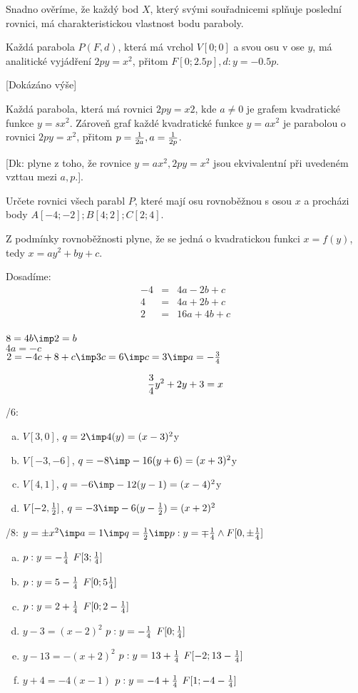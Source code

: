 Snadno ověríme, že každý bod $X$, který svými souřadnicemi splňuje poslední rovnici, má charakteristickou vlastnost bodu paraboly.

\V 
Každá parabola $P(F,d)$, která má vrchol $V[0;0]$ a svou osu v ose $y$, má analitické vyjádření $2py = x^2$, přitom $F[0;2.5p], d:y=-0.5p$.

[Dokázáno výše]

\V Každá parabola, která má rovnici $2py = x2$, kde $a\neq 0$ je grafem kvadratické funkce $y=sx^2$.
Zároveň graf každé kvadratické funkce $y=ax^2$ je parabolou o rovnici $2py=x^2$, přitom $p = \frac 1{2a},a=\frac1{2p}$.

[Dk: plyne z toho, že rovnice $y=ax^2, 2py = x^2$ jsou ekvivalentní při uvedeném vzttau mezi $a,p$.].

\Pr Určete rovnici všech parabl $P$, které mají osu rovnoběžnou s osou $x$ a procházi body $A[-4;-2];B[4;2];C[2;4]$.

Z podmínky rovnoběžnosti plyne, že se jedná o kvadratickou funkci $x = f(y)$, tedy $x = a y^2 + by + c$.

Dosadíme:
\begin{eqnarray}
	-4 &=& 4a -2 b +c \\
	 4 &=& 4a +2 b +c\\
	 2 &=& 16a + 4b +c\\
\end{eqnarray}

$ 8 =  4b \imp 2 = b$\\
$ 4a = - c$\\
$ 2 =  - 4c + 8 + c \imp 3c = 6 \imp c = 3  \imp a  = - \f 3 4$

$$ \frac 3 4 y^2 + 2 y + 3 = x$$

/6:
\begin{enumerate}[a)]
	\item $V[3,0]$, $q = 2 \imp 4(y)= (x-3)^2$y
	\item $V[-3,-6]$, $q = -8 \imp -16(y+6)= (x+3)^2$y
	\item $V[4,1]$, $q = -6 \imp -12(y-1)= (x-4)^2$y
	\item $V[-2,\frac 1 2]$, $q = -3 \imp -6(y-\f 12)= (x+2)^2$
\end{enumerate}

/8:
$y = \pm x^2 \imp a = 1\imp q = \f 1 2 \imp p: y = \mp \f 1 4 \land F[0,\pm \f 1 4]$

\begin{enumerate}[a)]
	\item $p:y = -\frac 1 4$ $F[3;\frac 1 4]$
	\item $p:y = 5-\frac 1 4$ $F[0;5\frac 1 4]$
	\item $p:y = 2+\frac 1 4$ $F[0;2-\frac 1 4]$
	\item $y-3 = (x-2)^2$
		$p:y = -\frac 1 4$ $F[0;\frac 1 4]$
	\item $ y - 13  =  - (x+2)^2 $
		$p:y = 13+\frac 1 4$ $F[-2;13-\frac 1 4]$
	\item $y + 4 = -4(x-1)$
		$p:y = -4+\frac 1 4$ $F[1;-4-\frac 1 4]$
\end{enumerate}

